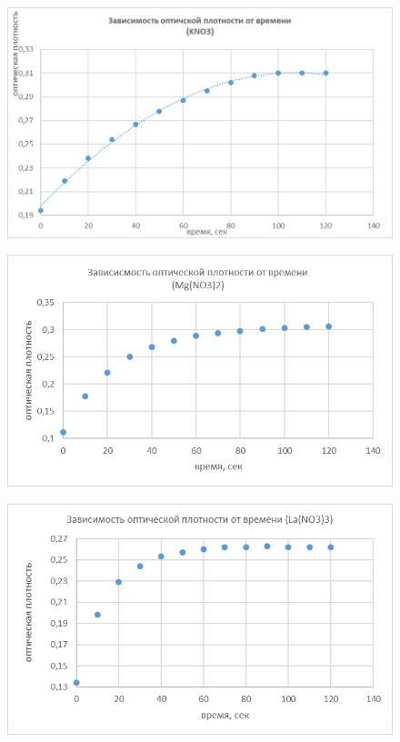\documentclass[a4paper, 12pt]{article}
\begin{document}
\begin{figure}[h]
	\centering
	\caption{}
	\includegraphics[width=1\textwidth]{image001.png}
\end{figure}
\newpage


\begin{figure}[t]
	\centering
	\caption{}
	\includegraphics[width=1\textwidth]{image005.png}
\end{figure}

\begin{figure}[h!]
	\centering
	\caption{}
	\includegraphics[width=1\textwidth]{image003.png}
\end{figure}
\end{document}
